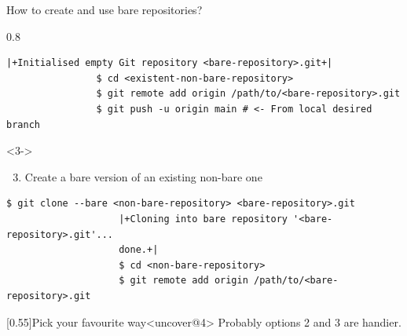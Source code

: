 \documentclass[usenames,svgnames,14pt]{beamer}
\begin{document}
\begin{frame}[fragile]{How to create and use bare repositories?}
\begin{overlayarea}{\textwidth}{0.8\textheight}
\begin{onlyenv}
\begin{lstlisting}[style=MyBash]
                |+Initialised empty Git repository <bare-repository>.git+|
                $ cd <existent-non-bare-repository>
                $ git remote add origin /path/to/<bare-repository>.git
                $ git push -u origin main # <- From local desired branch
            \end{lstlisting}
            \vspace{1mm}
            \begin{uncoverenv}<3->
                \begin{enumerate}
                    \setcounter{enumi}{2}
                    \item Create a bare version of an existing non-bare one
                \end{enumerate}
                \begin{lstlisting}[style=MyBash]
                    $ git clone --bare <non-bare-repository> <bare-repository>.git
                    |+Cloning into bare repository '<bare-repository>.git'...
                    done.+|
                    $ cd <non-bare-repository>
                    $ git remote add origin /path/to/<bare-repository>.git
                \end{lstlisting}
            \end{uncoverenv}
            \vspace{-1mm}
            \begin{varblock}{}[0.55\textwidth]{Pick your favourite way}<uncover@4>
                \small Probably options 2 and 3 are handier.
            \end{varblock}
        \end{onlyenv}
    \end{overlayarea}
\end{frame}


\end{document}

